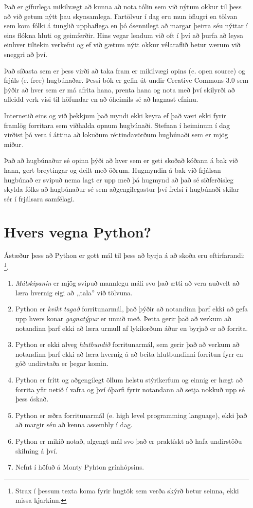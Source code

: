 Það er gífurlega mikilvægt að kunna að nota tólin sem við nýtum okkur til þess að við getum nýtt þau skynsamlega.
Fartölvur í dag eru mun öflugri en tölvan sem kom fólki á tunglið upphaflega en þó ósennilegt að margar þeirra séu nýttar í eins flókna hluti og geimferðir.
Hins vegar lendum við oft í því að þurfa að leysa einhver tiltekin verkefni og ef við gætum nýtt okkur vélaraflið betur værum við sneggri að því.

Það síðasta sem er þess virði að taka fram er mikilvægi opins (e. open source) og frjáls (e. free) hugbúnaðar.
Þessi bók er gefin út undir Creative Commons 3.0 sem þýðir að hver sem er má afrita hana, prenta hana og nota með því skilyrði að afleidd verk vísi til höfundar en að óheimils sé að hagnast efninu.

Internetið eins og við þekkjum það myndi ekki keyra ef það væri ekki fyrir framlög forritara sem viðhalda opnum hugbúnaði.
Stefnan í heiminum í dag virðist þó vera í áttina að lokuðum réttindavörðum hugbúnaði sem er mjög miður. 

Það að hugbúnaður sé opinn þýði að hver sem er geti skoðað kóðann á bak við hann, gert breytingar og deilt með öðrum.
Hugmyndin á bak við frjálsan hugbúnað er svipuð nema lagt er upp með þá hugmynd að það sé siðferðisleg skylda fólks að hugbúnaður sé sem aðgengilegastur því frelsi í hugbúnaði skilar sér í frjálsara samfélagi.

\section{Hvers vegna Python?}

Ástæður þess að Python er gott mál til þess að byrja á að skoða eru eftirfarandi: \footnote{Strax í þessum texta koma fyrir hugtök sem verða skýrð betur seinna, ekki missa kjarkinn.}.

\begin{enumerate}
	\item \textit{Málskipanin} er mjög svipuð mannlegu máli svo það ætti að vera auðvelt að læra hvernig eigi að ,,tala'' við tölvuna.
	\item  Python er \textit{kvikt tagað} forritunarmál, það þýðir að notandinn þarf ekki að gefa upp hvers konar \textit{gagnatýpur} er unnið með. 
	Þetta gerir það að verkum að notandinn þarf ekki að læra urmull af lykilorðum áður en byrjað er að forrita.
	\item  Python er ekki alveg \textit{hlutbundið} forritunarmál, sem gerir það að verkum að notandinn þarf ekki að læra hvernig á að beita hlutbundinni forritun fyrr en góð undirstaða er þegar komin.
	\item Python er frítt og aðgengilegt öllum helstu stýrikerfum og einnig er hægt að forrita yfir netið í vafra og því óþarfi fyrir notandann að setja nokkuð upp sé þess óskað.
	\item Python er æðra forritunarmál (e. high level programming language), ekki það að margir séu að kenna assembly í dag.
	\item Python er mikið notað, algengt mál svo það er praktískt að hafa undirstöðu skilning á því.
	\item Nefnt í höfuð á Monty Pyhton grínhópsins.
\end{enumerate}

